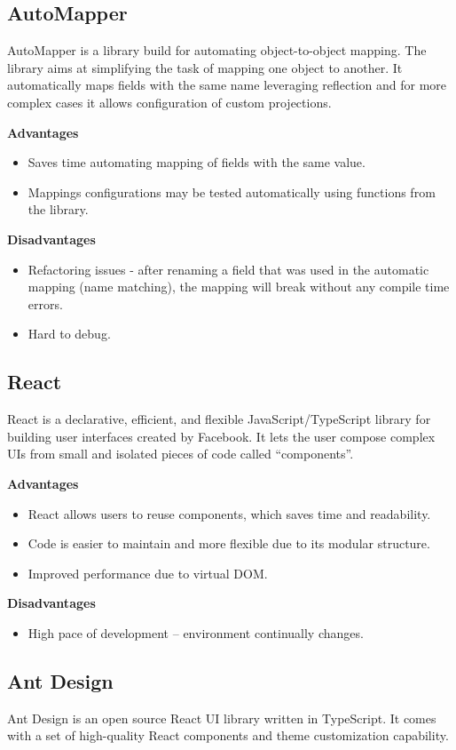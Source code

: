 \subsection{AutoMapper}
AutoMapper\cite{automapper} is a library build for automating object-to-object mapping. The library aims at simplifying the task of mapping one object to another. It automatically maps fields with the same name leveraging reflection and for more complex cases it allows configuration of custom projections.

\textbf{Advantages}
\begin{itemize}
    \item Saves time automating mapping of fields with the same value.
    \item Mappings configurations may be tested automatically using functions from the library.
\end{itemize}
\textbf{Disadvantages}
\begin{itemize}
    \item Refactoring issues - after renaming a field that was used in the automatic mapping (name matching), the mapping will break without any compile time errors.
    \item Hard to debug.
\end{itemize}

\subsection{React}
React \cite{react} is a declarative, efficient, and flexible JavaScript/TypeScript library for building user interfaces created by Facebook. It lets the user compose complex UIs from small and isolated pieces of code called “components”.

\textbf{Advantages}
\begin{itemize}
    \item React allows users to reuse components, which saves time and readability.
    \item Code is easier to maintain and more flexible due to its modular structure.
    \item Improved performance due to virtual DOM.
\end{itemize}
\textbf{Disadvantages}
\begin{itemize}
    \item High pace of development – environment continually changes.
\end{itemize}

\subsection{Ant Design}
Ant Design \cite{ant_design} is an open source React UI library written in TypeScript. It comes with a set of high-quality React components and theme customization capability.

